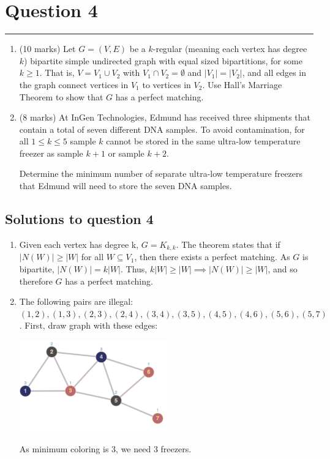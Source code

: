 \documentclass{article}
\begin{document}
\section*{Question 4}
\vspace{0.5cm}\hrule
\vspace{0.5cm}

\begin{enumerate}[label=(\alph*)]
    \item (10 marks) Let $G = (V, E)$ be a $k$-regular (meaning each vertex has degree $k$) bipartite simple undirected graph with equal sized bipartitions, for some $k \geq 1$. That is, $V = V_1 \cup V_2$ with $V_1 \cap V_2 = \emptyset$ and $|V_1| = |V_2|$, and all edges in the graph connect vertices in $V_1$ to vertices in $V_2$. Use Hall’s Marriage Theorem to show that $G$ has a perfect matching.

    \item (8 marks) At InGen Technologies, Edmund has received three shipments that contain a total of seven different DNA samples. To avoid contamination, for all $1 \leq k \leq 5$ sample $k$ cannot be stored in the same ultra-low temperature freezer as sample $k + 1$ or sample $k + 2$.

          Determine the minimum number of separate ultra-low temperature freezers that Edmund will need to store the seven DNA samples.
\end{enumerate}

\subsection*{Solutions to question 4}

\begin{enumerate}[label=(\alph*)]
    \item Given each vertex has degree k, $G=K_{k,k}$. The theorem states that if $|N(W)| \geq |W|$ for all $W \subseteq V_1$, then there exists a perfect matching. As $G$ is bipartite, $|N(W)| = k|W|$. Thus, $k|W| \geq |W| \implies |N(W)| \geq |W|$, and so therefore $G$ has a perfect matching.
    \item The following pairs are illegal: $(1,2), (1,3), (2,3), (2,4), (3,4), (3,5), (4,5), (4,6), (5,6), (5,7)$. First, draw graph with these edges:

          \includegraphics[width=0.5\textwidth]{5-4-b.png}

          As minimum coloring is 3, we need 3 freezers.
\end{enumerate}
\end{document}
